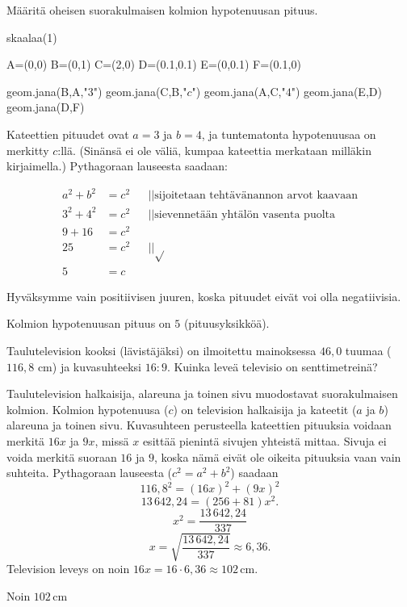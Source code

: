 \begin{esimerkki}

Määritä oheisen suorakulmaisen kolmion hypotenuusan pituus.
\begin{center}
\begin{kuva}
	skaalaa(1)

	A=(0,0)
	B=(0,1)
	C=(2,0)
	D=(0.1,0.1)
	E=(0,0.1)
	F=(0.1,0)

	geom.jana(B,A,"$3$")
	geom.jana(C,B,"$c$")
	geom.jana(A,C,"$4$")
	geom.jana(E,D)
	geom.jana(D,F)
\end{kuva}
\end{center}

\begin{esimratk}
Kateettien pituudet ovat $a=3$ ja $b=4$, ja tuntematonta hypotenuusaa on merkitty $c$:llä. (Sinänsä ei ole väliä, kumpaa kateettia merkataan milläkin kirjaimella.) Pythagoraan lauseesta saadaan:

\begin{align*}
a^2+b^2 &= c^2  && || \text{sijoitetaan tehtävänannon arvot kaavaan} \\
3^2+4^2 &= c^2 && || \text{sievennetään yhtälön vasenta puolta} \\
9+16 &= c^2 && \\
25 &= c^2 && || \sqrt{} \\
5 &= c &&
\end{align*}

Hyväksymme vain positiivisen juuren, koska pituudet eivät voi olla negatiivisia.

\end{esimratk}
	\begin{esimvast}
Kolmion hypotenuusan pituus on $5$ (pituusyksikköä).
	\end{esimvast}
\end{esimerkki}

\begin{esimerkki}
Taulutelevision kooksi (lävistäjäksi) on ilmoitettu mainoksessa $46,0$ tuumaa ($116,8$ cm) ja kuvasuhteeksi $16:9$. Kuinka leveä televisio on senttimetreinä?

	\begin{esimratk}
Taulutelevision halkaisija, alareuna ja toinen sivu muodostavat suorakulmaisen kolmion. Kolmion hypotenuusa ($c$) on television halkaisija ja kateetit ($a$ ja $b$) alareuna ja toinen sivu. Kuvasuhteen perusteella kateettien pituuksia voidaan merkitä $16x$ ja $9x$, missä $x$ esittää pienintä sivujen yhteistä mittaa. Sivuja ei voida merkitä suoraan $16$ ja $9$, koska nämä eivät ole oikeita pituuksia vaan vain suhteita. Pythagoraan lauseesta ($c^2 = a^2 + b^2$) saadaan
\[
116,8^2 = (16x)^2 + (9x)^2
\]
\[
13\,642,24 = (256+81)x^2.
\]
\[
x^2 = \frac{13\,642,24}{337}
\]
\[
x= \sqrt{\frac{13\,642,24}{337}} \approx 6,36.
\]
Television leveys on noin $16x = 16\cdot 6,36\approx 102$\,cm.
	\end{esimratk}
	\begin{esimvast}
	Noin $102$\,cm
	\end{esimvast}
\end{esimerkki}

